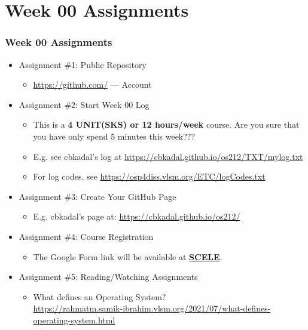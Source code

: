 \documentclass[xcolor=table, notheorems, hyperref={pdfpagelabels=false}]{beamer}
\begin{document}



\section{Week 00 Assignments}
\begin{frame}[fragile]
\frametitle{Week 00 Assignments}
\begin{itemize}
\item Assignment \#1: Public Repository
\begin{itemize}
\item \url{https://github.com/} --- Account
\end{itemize}
\item Assignment \#2: Start Week 00 Log
\begin{itemize}
\item This is a \textbf{4 UNIT(SKS) or 12 hours/week} course. Are you sure that you have only spend 5 minutes this week???
\item E.g. see cbkadal's log at \url{https://cbkadal.github.io/os212/TXT/mylog.txt}
\item For log codes, see \url{https://osp4diss.vlsm.org/ETC/logCodes.txt}
\end{itemize}
\item Assignment \#3: Create Your GitHub Page
\begin{itemize}
\item E.g. cbkadal's page at: \url{https://cbkadal.github.io/os212/}
\end{itemize}
\item Assignment \#4: Course Registration
\begin{itemize}
\item The Google Form link will be available at
\href{https://scele.cs.ui.ac.id/mod/forum/discuss.php?d=30285}{\textbf{SCELE}}.
\end{itemize}
\item Assignment \#5: Reading/Watching Assignments
\begin{itemize}
\item What defines an Operating System?\\ \url{https://rahmatm.samik-ibrahim.vlsm.org/2021/07/what-defines-operating-system.html}
\end{itemize}
\end{itemize}
\end{frame}
\end{document}
